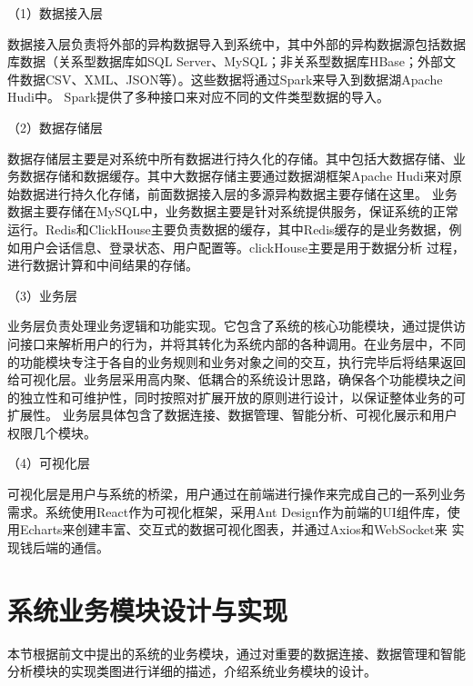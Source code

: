（1）数据接入层

数据接入层负责将外部的异构数据导入到系统中，其中外部的异构数据源包括数据库数据（关系型数据库如SQL Server、MySQL；非关系型数据库HBase；外部文件数据CSV、XML、JSON等）。这些数据将通过Spark来导入到数据湖Apache Hudi中。
Spark提供了多种接口来对应不同的文件类型数据的导入。

（2）数据存储层

数据存储层主要是对系统中所有数据进行持久化的存储。其中包括大数据存储、业务数据存储和数据缓存。其中大数据存储主要通过数据湖框架Apache Hudi来对原始数据进行持久化存储，前面数据接入层的多源异构数据主要存储在这里。
业务数据主要存储在MySQL中，业务数据主要是针对系统提供服务，保证系统的正常运行。Redis和ClickHouse主要负责数据的缓存，其中Redis缓存的是业务数据，例如用户会话信息、登录状态、用户配置等。clickHouse主要是用于数据分析
过程，进行数据计算和中间结果的存储。

（3）业务层 

业务层负责处理业务逻辑和功能实现。它包含了系统的核心功能模块，通过提供访问接口来解析用户的行为，并将其转化为系统内部的各种调用。在业务层中，不同的功能模块专注于各自的业务规则和业务对象之间的交互，执行完毕后将结果返回给可视化层。业务层采用高内聚、低耦合的系统设计思路，确保各个功能模块之间的独立性和可维护性，同时按照对扩展开放的原则进行设计，以保证整体业务的可扩展性。
业务层具体包含了数据连接、数据管理、智能分析、可视化展示和用户权限几个模块。

（4）可视化层

可视化层是用户与系统的桥梁，用户通过在前端进行操作来完成自己的一系列业务需求。系统使用React作为可视化框架，采用Ant Design作为前端的UI组件库，使用Echarts来创建丰富、交互式的数据可视化图表，并通过Axios和WebSocket来
实现钱后端的通信。

\section{系统业务模块设计与实现}
本节根据前文中提出的系统的业务模块，通过对重要的数据连接、数据管理和智能分析模块的实现类图进行详细的描述，介绍系统业务模块的设计。
